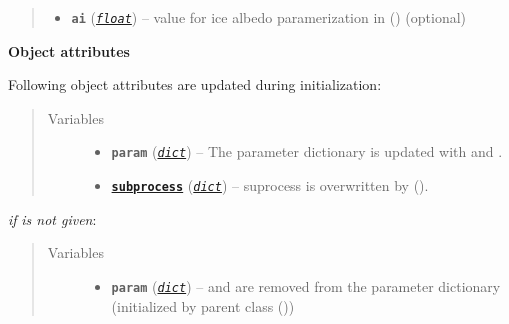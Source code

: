 \documentclass[a4paper,10pt,english]{sphinxmanual}
\begin{document}
\begin{fulllineitems}
\begin{quote}
\begin{description}
\begin{itemize}
\item {} 
\textbf{\texttt{ai}} (\href{http://docs.python.org/2.7/library/functions.html\#float}{\emph{\texttt{float}}}) -- value for ice albedo paramerization in
{\hyperref[api/climlab.surface:climlab.surface.albedo.StepFunctionAlbedo]{\emph{}}} ()
(optional)

\end{itemize}

\end{description}\end{quote}

\textbf{Object attributes}

Following object attributes are updated during initialization:
\begin{quote}\begin{description}
\item[{Variables}] \leavevmode\begin{itemize}
\item {} 
\textbf{\texttt{param}} (\href{http://docs.python.org/2.7/library/stdtypes.html\#dict}{\emph{\texttt{dict}}}) -- The parameter dictionary is updated with 
 and .

\item {} 
\href{http://docs.python.org/2.7/library/subprocess.html\#module-subprocess}{\textbf{\texttt{subprocess}}} (\href{http://docs.python.org/2.7/library/stdtypes.html\#dict}{\emph{\texttt{dict}}}) -- suprocess  is overwritten by
{\hyperref[api/climlab.radiation:climlab.radiation.insolation.DailyInsolation]{\emph{}}} ().

\end{itemize}

\end{description}\end{quote}

\emph{if}  \emph{is not given}:
\begin{quote}\begin{description}
\item[{Variables}] \leavevmode\begin{itemize}
\item {} 
\textbf{\texttt{param}} (\href{http://docs.python.org/2.7/library/stdtypes.html\#dict}{\emph{\texttt{dict}}}) --  and  are removed from the 
parameter dictionary (initialized by parent class
{\hyperref[api/climlab.model:climlab.model.ebm.EBM]{\emph{}}} ())


\end{itemize}
\end{description}
\end{quote}
\end{fulllineitems}
\end{document}
